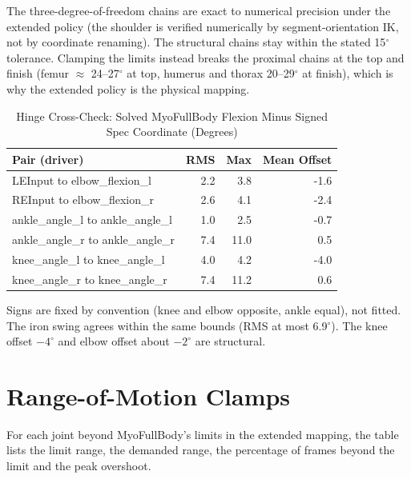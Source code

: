 \documentclass[11pt,a4paper]{article}
\begin{document}
\noindent The three-degree-of-freedom chains are exact to numerical precision under the extended policy (the shoulder is verified numerically by segment-orientation IK, not by coordinate renaming). The structural chains stay within the stated 15$^\circ$ tolerance. Clamping the limits instead breaks the proximal chains at the top and finish (femur $\approx$ 24--27$^\circ$ at top, humerus and thorax 20--29$^\circ$ at finish), which is why the extended policy is the physical mapping.

\begin{table}[h]\centering\small
\caption{Hinge Cross-Check: Solved MyoFullBody Flexion Minus Signed Spec Coordinate (Degrees)}
\begin{tabular}{lrrr}\toprule Pair (driver) & RMS & Max & Mean Offset \\\midrule
LEInput to elbow\_flexion\_l & 2.2 & 3.8 & -1.6 \\
REInput to elbow\_flexion\_r & 2.6 & 4.1 & -2.4 \\
ankle\_angle\_l to ankle\_angle\_l & 1.0 & 2.5 & -0.7 \\
ankle\_angle\_r to ankle\_angle\_r & 7.4 & 11.0 & 0.5 \\
knee\_angle\_l to knee\_angle\_l & 4.0 & 4.2 & -4.0 \\
knee\_angle\_r to knee\_angle\_r & 7.4 & 11.2 & 0.6 \\
\bottomrule\end{tabular}\end{table}
\noindent Signs are fixed by convention (knee and elbow opposite, ankle equal), not fitted. The iron swing agrees within the same bounds (RMS at most 6.9$^\circ$). The knee offset $-4^\circ$ and elbow offset about $-2^\circ$ are structural.

\section{Range-of-Motion Clamps}
For each joint beyond MyoFullBody's limits in the extended mapping, the table lists the limit range, the demanded range, the percentage of frames beyond the limit and the peak overshoot.
\end{document}
